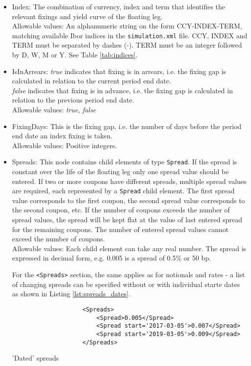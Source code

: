 \begin{itemize}
\item Index:  The combination of currency, index and term that identifies the relevant fixings and yield curve of the floating leg.  \\ Allowable values:  An alphanumeric string on the form CCY-INDEX-TERM,  matching available Ibor indices in the {\tt simulation.xml} file. CCY, INDEX and TERM must be separated by dashes (-). TERM must be an integer followed by D, W, M or Y. See Table \ref{tab:indices}.
\item IsInArrears:  \emph{true} indicates that  fixing is in arrears, i.e. the fixing gap is calculated in relation to the current period end date.\\ \emph{false} indicates that  fixing is in advance, i.e. the fixing gap is calculated in relation to the previous period end date.  \\ Allowable values:  \emph{true, false}
\item FixingDays: This is the fixing gap, i.e. the number of days before the period end date an index fixing is taken.   \\ Allowable values:  Positive integers.  
\item Spreads: This node contains child elements of type \lstinline!Spread!. If the spread is constant over the life of the floating leg only one spread value should be entered. If two or more coupons have different spreads, multiple spread values are required, each represented by a \lstinline!Spread! child element. The first spread value corresponds to the first coupon, the second spread value corresponds to the second coupon, etc. If the number of coupons exceeds the number of spread values, the spread will be kept flat at the value of last entered spread for the remaining coupons.  The number of entered spread values cannot exceed the number of coupons. \\Allowable values: Each child element can take any  real number. The spread is expressed in decimal form, e.g. 0.005 is a spread of 0.5\% or 50 bp.

For the {\tt <Spreads>} section, the same applies as for notionals and
rates - a list of changing spreads can be specified without or with individual starte dates as shown
in Listing \ref{lst:spreads_dates}.
\begin{listing}[H]
\begin{verbatim}
                    <Spreads>
                        <Spread>0.005</Spread>
                        <Spread start='2017-03-05'>0.007</Spread>
                        <Spread start='2019-03-05'>0.009</Spread>
                    </Spreads>
\end{verbatim}
\caption{'Dated' spreads}
\label{lst:spreads_dates}
\end{listing}
\end{itemize}

